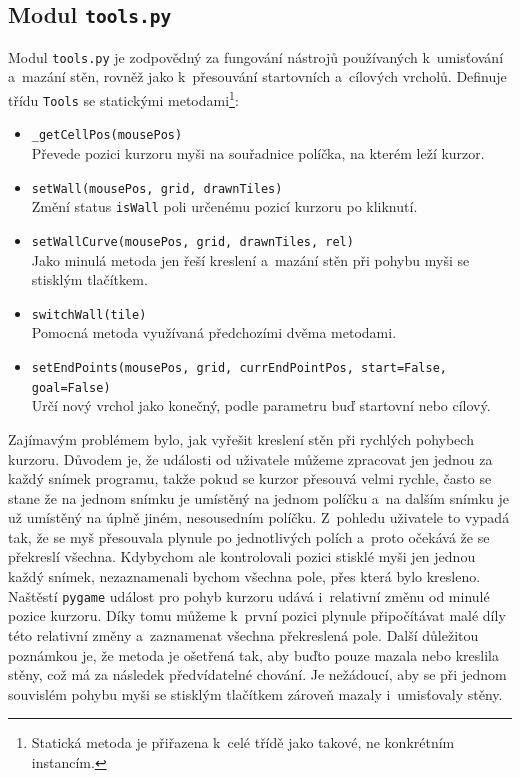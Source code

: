 \documentclass[12pt]{report}			%
\begin{document}
			
			
			\subsection{Modul \texttt{tools.py}}
			Modul \texttt{tools.py} je zodpovědný za fungování nástrojů používaných k~umisťování a~mazání stěn, rovněž jako k~přesouvání startovních a~cílových vrcholů. Definuje třídu \texttt{Tools} se statickými metodami\footnote{Statická metoda je přiřazena k~celé třídě jako takové, ne konkrétním instancím.}:
			\begin{itemize}
			\setlength\itemsep{0.01mm}
			\item \texttt{\_getCellPos(mousePos)}\\
			Převede pozici kurzoru myši na souřadnice políčka, na kterém leží kurzor.
			\item \texttt{setWall(mousePos, grid, drawnTiles)}\\
			Změní status \texttt{isWall} poli určenému pozicí kurzoru po kliknutí.
			\item \texttt{setWallCurve(mousePos, grid, drawnTiles, rel)}\\
			Jako minulá metoda jen řeší kreslení a~mazání stěn při pohybu myši se stisklým tlačítkem.
			\item \texttt{switchWall(tile)}\\
			Pomocná metoda využívaná předchozími dvěma metodami.
			\item \texttt{setEndPoints(mousePos, grid, currEndPointPos, start=False, goal=False)}\\
			Určí nový vrchol jako konečný, podle parametru buď startovní nebo cílový.
			\end{itemize}						

			
			Zajímavým problémem bylo, jak vyřešit kreslení stěn při rychlých pohybech kurzoru. Důvodem je, že události od uživatele můžeme zpracovat jen jednou za každý snímek programu, takže pokud se kurzor přesouvá velmi rychle, často se stane že na jednom snímku je umístěný na jednom políčku a~na dalším snímku je už umístěný na úplně jiném, nesousedním políčku. Z~pohledu uživatele to vypadá tak, že se myš přesouvala plynule po jednotlivých polích a~proto očekává že se překreslí všechna. Kdybychom ale kontrolovali pozici stisklé myši jen jednou každý snímek, nezaznamenali bychom všechna pole, přes která bylo kresleno. Naštěstí \texttt{pygame} událost pro pohyb kurzoru udává i~relativní změnu od minulé pozice kurzoru. Díky tomu můžeme k~první pozici plynule připočítávat malé díly této relativní změny a~zaznamenat všechna překreslená pole. Další důležitou poznámkou je, že metoda je ošetřená tak, aby buďto pouze mazala nebo kreslila stěny, což má za následek předvídatelné chování. Je nežádoucí, aby se při jednom souvislém pohybu myši se stisklým tlačítkem zároveň mazaly i~umisťovaly stěny.
			
\end{document}
